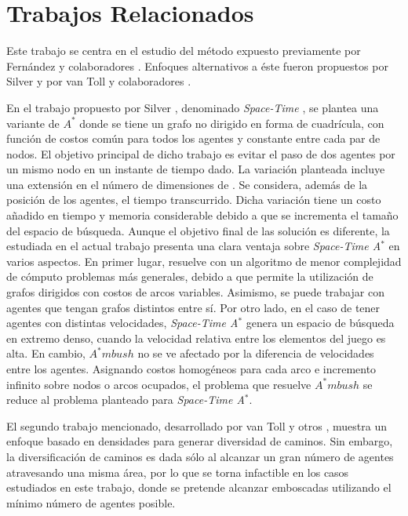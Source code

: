 \section{Trabajos Relacionados}
\label{sec:state_of_the_art}

Este trabajo se centra en el estudio del m\'etodo expuesto
previamente por Fern\'andez y colaboradores \cite{FGC12e}\cite{FGC12}.
Enfoques alternativos a \'este fueron propuestos por Silver \cite{Sil06}
y por van Toll y colaboradores \cite{TCG12}.

En el trabajo propuesto por Silver \cite{Sil06}, denominado
\textit{Space-Time \astar}, se plantea una variante de $A^*$ 
donde se tiene un grafo no dirigido en forma de cuadrícula,
con función de costos común para todos los agentes y 
constante entre cada par de nodos.
El objetivo principal de dicho trabajo es evitar el paso de
dos agentes por un mismo nodo en un instante de tiempo dado.
La variación planteada incluye una extensión en el número
de dimensiones de \astar. Se considera, además de la posición
de los agentes, el tiempo transcurrido. Dicha variación tiene
un costo añadido en tiempo y memoria considerable debido a que
se incrementa el tamaño del espacio de búsqueda. Aunque el objetivo
final de las soluci\'on es diferente, la estudiada en el actual
trabajo presenta una clara ventaja sobre \textit{Space-Time A$^*$}
en varios aspectos. En primer lugar, resuelve con un algoritmo
de menor complejidad de c\'omputo problemas m\'as generales, debido a
que permite la utilizaci\'on de grafos dirigidos con costos de arcos
variables. Asimismo, se puede trabajar con agentes que
tengan grafos distintos entre sí.
Por otro lado, en el caso de tener agentes con distintas velocidades,
\textit{Space-Time A$^*$} genera un espacio de búsqueda en extremo
denso, cuando la velocidad relativa entre los e\-le\-men\-tos del juego es
alta. En cambio, $A^*mbush$ no se ve afectado por la diferencia de 
velocidades entre los agentes.
Asignando costos homogéneos para cada arco e incremento infinito
sobre nodos o arcos ocupados, el problema que resuelve $A^*mbush$
se reduce al problema planteado para \textit{Space-Time
A$^*$}.

El segundo trabajo mencionado, desarrollado por van Toll y otros
\cite{TCG12}, muestra un enfoque basado en densidades para generar
diversidad de caminos. Sin embargo, la diversificaci\'on de caminos
es dada s\'olo al alcanzar un gran n\'umero de agentes atravesando una
misma \'area, por lo que se torna infactible en los casos estudiados
en este trabajo, donde se pretende alcanzar emboscadas utilizando
el m\'inimo n\'umero de agentes posible.
